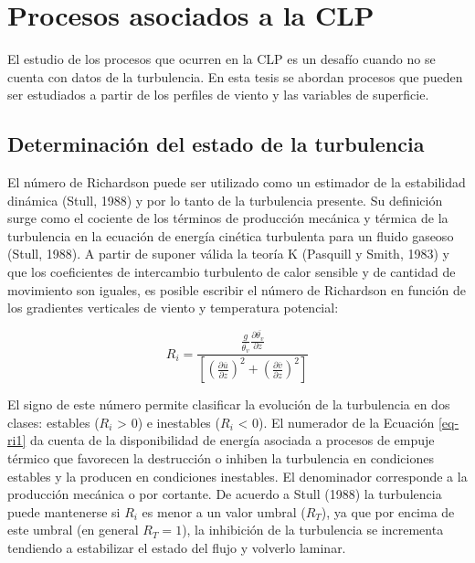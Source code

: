 \documentclass[12pt,spanish,oneside, a4paper]{book}
\begin{document}
\section{Procesos asociados a la CLP}\label{procesos-asociados-a-la-clp}

El estudio de los procesos que ocurren en la CLP es un desafío cuando no
se cuenta con datos de la turbulencia. En esta tesis se abordan procesos
que pueden ser estudiados a partir de los perfiles de viento y las
variables de superficie.

\subsection{Determinación del estado de la
turbulencia}\label{determinacion-del-estado-de-la-turbulencia}

El número de Richardson puede ser utilizado como un estimador de la
estabilidad dinámica (Stull, 1988) y por lo tanto de la turbulencia
presente. Su definición surge como el cociente de los términos de
producción mecánica y térmica de la turbulencia en la ecuación de
energía cinética turbulenta para un fluido gaseoso (Stull, 1988). A
partir de suponer válida la teoría K (Pasquill y Smith, 1983) y que los
coeficientes de intercambio turbulento de calor sensible y de cantidad
de movimiento son iguales, es posible escribir el número de Richardson
en función de los gradientes verticales de viento y temperatura
potencial:

\begin{equation} \label{eq-ri1}
R_i = \frac{\frac{g}{\overline{\theta_v}} \frac{\partial \overline{\theta_v}}{\partial z}}
{\left [ \left (\frac{\partial \overline{u}}{\partial z} \right )^2 + \left (\frac{\partial \overline{v}}{\partial z} \right )^2  \right]}
\end{equation}

El signo de este número permite clasificar la evolución de la
turbulencia en dos clases: estables (\(R_i\) \textgreater{} 0) e
inestables (\(R_i\) \textless{} 0). El numerador de la Ecuación
\ref{eq-ri1} da cuenta de la disponibilidad de energía asociada a
procesos de empuje térmico que favorecen la destrucción o inhiben la
turbulencia en condiciones estables y la producen en condiciones
inestables. El denominador corresponde a la producción mecánica o por
cortante. De acuerdo a Stull (1988) la turbulencia puede mantenerse si
\(R_i\) es menor a un valor umbral (\(R_T\)), ya que por encima de este
umbral (en general \(R_T = 1\)), la inhibición de la turbulencia se
incrementa tendiendo a estabilizar el estado del flujo y volverlo
laminar.
\end{document}
